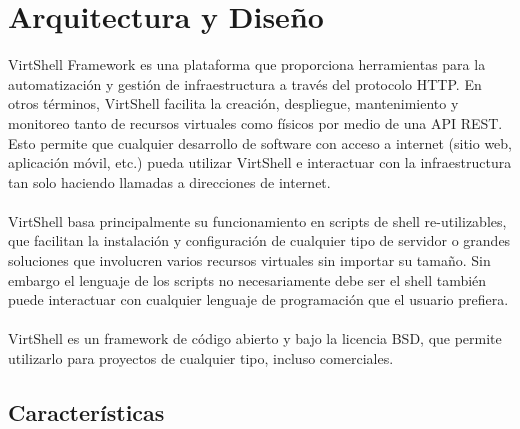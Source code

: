 \chapter{Arquitectura y Diseño}
\label{Arquitectura}

VirtShell Framework es una plataforma que proporciona herramientas para la automatización y gestión de infraestructura a través del protocolo HTTP. En otros términos, VirtShell facilita la creación, despliegue, mantenimiento y monitoreo tanto de recursos virtuales como físicos por medio de una API REST. Esto permite que cualquier desarrollo de software con acceso a internet (sitio web, aplicación móvil, etc.) pueda utilizar VirtShell e interactuar con la infraestructura tan solo haciendo llamadas a direcciones de internet. \\
\\
VirtShell basa principalmente su funcionamiento en scripts de shell re-utilizables, que facilitan la instalación y configuración de cualquier tipo de servidor o grandes soluciones que involucren varios recursos virtuales sin importar su tamaño. Sin embargo el lenguaje de los scripts no necesariamente debe ser el shell también puede interactuar con cualquier lenguaje de programación que el usuario prefiera.\\
\\
VirtShell es un framework de código abierto y bajo la licencia BSD, que permite utilizarlo para proyectos de cualquier tipo, incluso comerciales. 

\section{Características}

